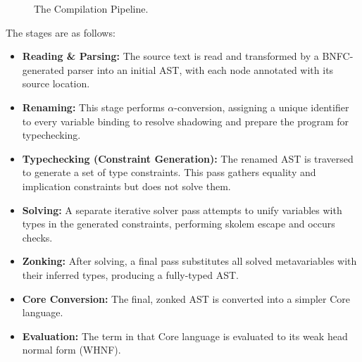 \begin{figure}[h!]
    \centering
    \caption{The \Arralac Compilation Pipeline.}
    \label{fig:pipeline}
\end{figure}

The stages are as follows:
\begin{itemize}
    \item \textbf{Reading \& Parsing:} The source text is read and transformed by a BNFC-generated parser \cite{bnfc-site-2025} into an initial AST, with each node annotated with its source location.
    \item \textbf{Renaming:} This stage performs $\alpha$-conversion, assigning a unique identifier to every variable binding to resolve shadowing and prepare the program for typechecking.
    \item \textbf{Typechecking (Constraint Generation):} The renamed AST is traversed to generate a set of type constraints. This pass gathers equality and implication constraints but does not solve them.
    \item \textbf{Solving:} A separate iterative solver pass attempts to unify variables with types in the generated constraints, performing skolem escape and occurs checks.
    \item \textbf{Zonking:} After solving, a final pass substitutes all solved metavariables with their inferred types, producing a fully-typed AST.
    \item \textbf{Core Conversion:} The final, zonked AST is converted into a simpler Core language.
    \item \textbf{Evaluation:} The term in that Core language is evaluated to its weak head normal form (WHNF).
\end{itemize}

